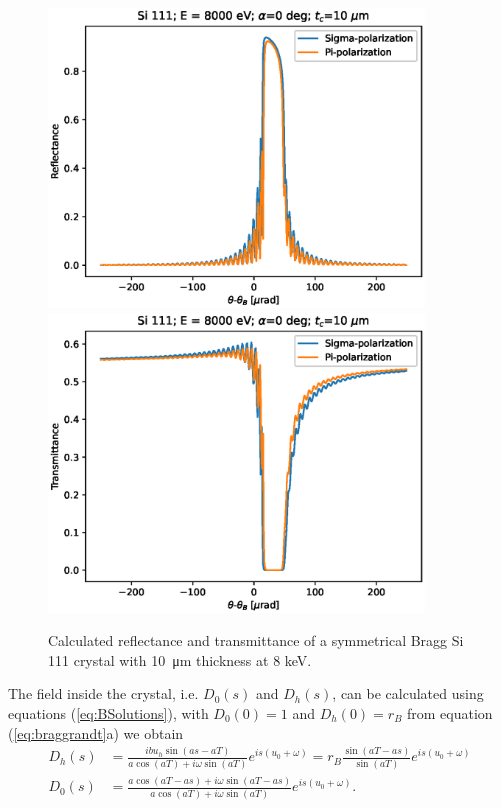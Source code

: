 \documentclass{iucr}
\begin{document}
\begin{figure}\label{fig:braggProfiles}
    \centering
    \includegraphics[width=0.89\textwidth]{figures/Bragg_1.eps}
    \includegraphics[width=0.89\textwidth]{figures/Bragg_2.eps}
    \caption{Calculated reflectance and transmittance of a symmetrical Bragg Si 111 crystal with \SI{10}{\micro\meter} thickness at 8 keV. }
\end{figure}

The field inside the crystal, i.e. $D_0(s)$ and $D_h(s)$, can be calculated using equations (\ref{eq:BSolutions}), with $D_0(0)=1$ and $D_h(0)=r_B$ from equation (\ref{eq:braggrandt}a) we obtain
\begin{subequations}\label{eq:bragginside}
\begin{align}
D_h(s)&=\frac{i b u_h \sin(as - aT)}{a \cos(aT) + i \omega \sin(aT)} e^{is(u_0+\omega)} 
= r_B \frac{\sin(aT - as)}{\sin(aT)} e^{is(u_0+\omega)}\\
D_0(s)&= \frac{a \cos(aT-as) + i \omega \sin(aT-as)}{a \cos(aT) + i \omega \sin(aT)} e^{is(u_0+\omega)}.
\end{align}
\end{subequations}
\end{document}
